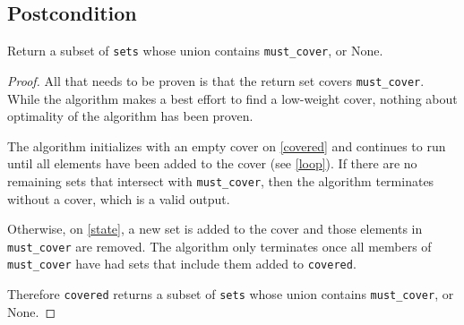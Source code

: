 \documentclass{article}
\begin{document}
\subsection*{Postcondition}
\begin{theorem}
Return a subset of \texttt{sets} whose union contains \texttt{must\_cover}, or None.
\end{theorem}
\begin{proof}
    All that needs to be proven is that the return set covers \texttt{must\_cover}.
    While the algorithm makes a best effort to find a low-weight cover,
    nothing about optimality of the algorithm has been proven.

    The algorithm initializes with an empty cover on \ref{covered} and
    continues to run until all elements have been added to the cover (see \ref{loop}).
    If there are no remaining sets that intersect with \texttt{must\_cover},
    then the algorithm terminates without a cover, which is a valid output.

    Otherwise, on \ref{state}, a new set is added to the cover and those elements in \texttt{must\_cover} are removed.
    The algorithm only terminates once all members of \texttt{must\_cover} have had sets that include them added to \texttt{covered}.

    Therefore \texttt{covered} returns a subset of \texttt{sets}
    whose union contains \texttt{must\_cover}, or None.

\end{proof}
\end{document}
